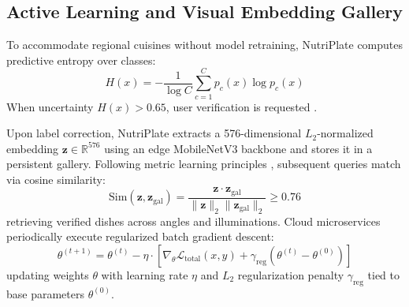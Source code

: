\documentclass[conference]{IEEEtran}
\begin{document}
\subsection{Active Learning and Visual Embedding Gallery}
To accommodate regional cuisines without model retraining, NutriPlate computes predictive entropy over classes:
\begin{equation}
H(x) = -\frac{1}{\log C} \sum_{c=1}^C p_c(x) \log p_c(x)
\label{eq:entropy}
\end{equation}
When uncertainty $H(x) > 0.65$, user verification is requested \cite{settles2009active}.

Upon label correction, NutriPlate extracts a 576-dimensional $L_2$-normalized embedding $\mathbf{z} \in \mathbb{R}^{576}$ using an edge MobileNetV3 backbone \cite{howard2019mobilenetv3} and stores it in a persistent gallery. Following metric learning principles \cite{schroff2015facenet, guo2017calibration}, subsequent queries match via cosine similarity:
\begin{equation}
\text{Sim}(\mathbf{z}, \mathbf{z}_{\text{gal}}) = \frac{\mathbf{z} \cdot \mathbf{z}_{\text{gal}}}{\|\mathbf{z}\|_2 \|\mathbf{z}_{\text{gal}}\|_2} \ge 0.76
\label{eq:cosine_sim}
\end{equation}
retrieving verified dishes across angles and illuminations. Cloud microservices periodically execute regularized batch gradient descent:
\begin{equation}
\theta^{(t+1)} = \theta^{(t)} - \eta \cdot \left[ \nabla_{\theta}\mathcal{L}_{\text{total}}(x, y) + \gamma_{\text{reg}}(\theta^{(t)} - \theta^{(0)}) \right]
\label{eq:active_update}
\end{equation}
updating weights $\theta$ with learning rate $\eta$ and $L_2$ regularization penalty $\gamma_{\text{reg}}$ tied to base parameters $\theta^{(0)}$.
\end{document}

